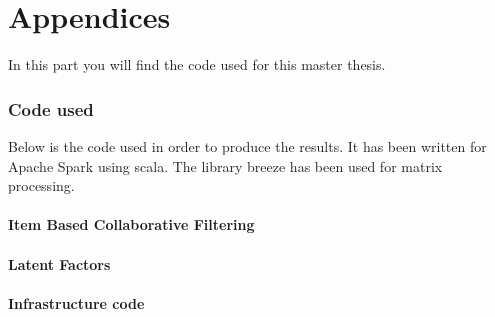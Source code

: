 \newpage
\appendix
\part{Appendices}
In this part you will find the code used for this master thesis.
\section{Code used}
Below is the code used in order to produce the results. It has been 
written for Apache Spark \cite{ApacheSpark:1} using scala. The library breeze has been used for matrix processing.
\subsection{Item Based Collaborative Filtering}

\subsection{Latent Factors}

\subsection{Infrastructure code}


\listoftables
\newpage
\listoffigures